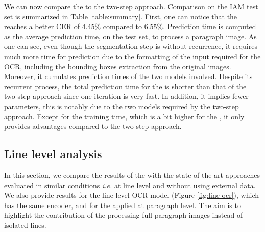 We can now compare the \modelname{} to the two-step approach. Comparison on the IAM test set is summarized in Table \ref{table:summary}. First, one can notice that the \modelacc{} reaches a better CER of 4.45\% compared to 6.55\%.
Prediction time is computed as the average prediction time, on the test set, to process a paragraph image. As one can see, even though the segmentation step is without recurrence, it requires much more time for prediction due to the formatting of the input required for the OCR, including the bounding boxes extraction from the original images. Moreover, it cumulates prediction times of the two models involved. 
Despite its recurrent process, the total prediction time for the \modelacc{} is shorter than that of the two-step approach since one iteration is very fast. In addition, it implies fewer parameters, this is notably due to the two models required by the two-step approach. Except for the training time, which is a bit higher for the \modelacc{}, it only provides advantages compared to the two-step approach.

\begin{table}[!h]
    \caption{Comparison of the two-step approach with the \modelname{}, results are given for the test set of the IAM dataset.}
    \centering
    \label{table:summary}
\end{table}

\subsection{Line level analysis}
\label{section-exp-line}

In this section, we compare the results of the \modelacc{} with the state-of-the-art approaches evaluated in similar conditions \textit{i.e.} at line level and without using external data. We also provide results for the line-level OCR model (Figure \ref{fig:line-ocr}), which has the same encoder, and for the \modelacc{} applied at paragraph level. The aim is to highlight the contribution of the \modelacc{} processing full paragraph images instead of isolated lines.

